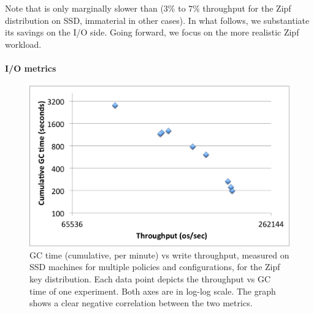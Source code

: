 Note that \adp\/ is only marginally slower than \basic\/ ($3$\% to $7$\% throughput for the Zipf 
distribution on SSD, immaterial in other cases).  In what follows, we substantiate  its savings 
on the I/O side. Going forward, we focus on the more realistic Zipf workload.

\paragraph{I/O metrics}

\begin{figure}[htb]
\includegraphics[width=\figw]{Figs/gc-throughput-log2.png}
\caption{GC time (cumulative, per minute) vs write throughput, measured on SSD machines 
for multiple \sys\/ policies and configurations, for the Zipf  key distribution. Each data point 
depicts the throughput vs GC time of one experiment. Both axes are in log-log scale.  
The graph shows a clear negative correlation between the two metrics. 
}
\label{fig:gc-throughput-log2}
\end{figure}

